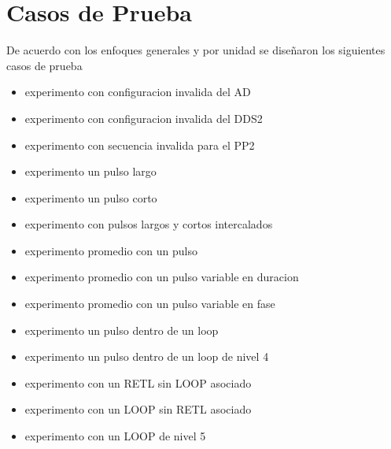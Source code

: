\section{Casos de Prueba}

De acuerdo con los enfoques generales y por unidad se diseñaron los siguientes casos de prueba

\begin{itemize}
\item experimento con configuracion invalida del AD
\item experimento con configuracion invalida del DDS2
\item experimento con secuencia invalida para el PP2
\item experimento un pulso largo
\item experimento un pulso corto
\item experimento con pulsos largos y cortos intercalados
\item experimento promedio con un pulso
\item experimento promedio con un pulso variable en duracion
\item experimento promedio con un pulso variable en fase
\item experimento un pulso dentro de un loop
\item experimento un pulso dentro de un loop de nivel 4
\item experimento con un RETL sin LOOP asociado
\item experimento con un LOOP sin RETL asociado
\item experimento con un LOOP de nivel 5
\end{itemize}

